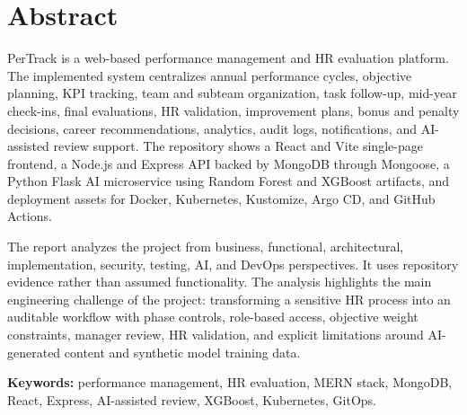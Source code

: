 \chapter*{Abstract}
PerTrack is a web-based performance management and HR evaluation platform. The implemented system centralizes annual performance cycles, objective planning, KPI tracking, team and subteam organization, task follow-up, mid-year check-ins, final evaluations, HR validation, improvement plans, bonus and penalty decisions, career recommendations, analytics, audit logs, notifications, and AI-assisted review support. The repository shows a React and Vite single-page frontend, a Node.js and Express API backed by MongoDB through Mongoose, a Python Flask AI microservice using Random Forest and XGBoost artifacts, and deployment assets for Docker, Kubernetes, Kustomize, Argo CD, and GitHub Actions.

The report analyzes the project from business, functional, architectural, implementation, security, testing, AI, and DevOps perspectives. It uses repository evidence rather than assumed functionality. The analysis highlights the main engineering challenge of the project: transforming a sensitive HR process into an auditable workflow with phase controls, role-based access, objective weight constraints, manager review, HR validation, and explicit limitations around AI-generated content and synthetic model training data.

\textbf{Keywords:} performance management, HR evaluation, MERN stack, MongoDB, React, Express, AI-assisted review, XGBoost, Kubernetes, GitOps.
\clearpage
